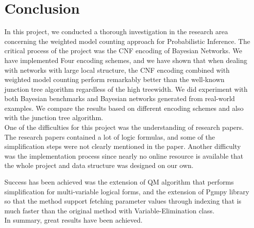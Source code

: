 \newpage
\section{Conclusion}
In this project, we conducted a thorough investigation in the research area concerning the weighted model counting approach for Probabilistic Inference. The critical process of the project was the CNF encoding of Bayesian Networks. We have implemented Four encoding schemes, and we have shown that when dealing with networks with large local structure, the CNF encoding combined with weighted model counting perform remarkably better than the well-known junction tree algorithm regardless of the high treewidth. We did experiment with both Bayesian benchmarks and Bayesian networks generated from real-world examples. We compare the results based on different encoding schemes and also with the junction tree algorithm.\\

\noindent One of the difficulties for this project was the understanding of research papers. The research papers contained a lot of logic formulas, and some of the simplification steps were not clearly mentioned in the paper. Another difficulty was the implementation process since nearly no online resource is available that the whole project and data structure was designed on our own. 

\noindent Success has been achieved was the extension of QM algorithm that performs simplification for multi-variable logical forms, and the extension of Pgmpy library so that the method support fetching parameter values through indexing that is much faster than the original method with Variable-Elimination class.\\

\noindent In summary, great results have been achieved.
